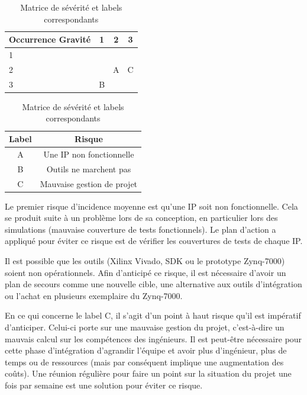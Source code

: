 \begin{table}[H]
	\centering
	\begin{tabular}{|p{2cm}|c|c|c|}
		\hline
		Occurrence \newline Gravité &1	& 2 & 3 \\
		\hline
		1	&  \cellcolor{green} & \cellcolor{green} & \cellcolor{orange}\\
		\hline
		2	& \cellcolor{green}	& A \cellcolor{orange}	& C\cellcolor{red}\\
		\hline
		3	& B \cellcolor{orange}	&	\cellcolor{red}& \cellcolor{red}\\
		\hline
	\end{tabular}
	\hspace{2cm}
	\begin{tabular}{|c|c|}
		\hline
		Label & Risque \\ \hline
		A	\cellcolor{orange} & Une IP non fonctionnelle \\ \hline
		B	\cellcolor{orange} &	Outils ne marchent pas \\ \hline
		C	\cellcolor{red} &	Mauvaise gestion de projet \\ \hline
	\end{tabular}
	\caption{Matrice de sévérité et labels correspondants}
\end{table}

Le premier risque d'incidence moyenne est qu'une IP soit non fonctionnelle.
Cela se produit suite à un problème lors de sa conception, en particulier lors des simulations (mauvaise couverture de tests fonctionnels).
Le plan d'action a appliqué pour éviter ce risque est de vérifier les couvertures de tests de chaque IP.

Il est possible que les outils (Xilinx Vivado, SDK ou le prototype Zynq-7000) soient non opérationnels.
Afin d'anticipé ce risque, il est nécessaire d'avoir un plan de secours comme une nouvelle cible, une alternative aux outils d'intégration ou l'achat en plusieurs exemplaire du Zynq-7000.

En ce qui concerne le label C, il s'agit d'un point à haut risque qu'il est impératif d'anticiper.
Celui-ci porte sur une mauvaise gestion du projet, c'est-à-dire un mauvais calcul sur les compétences des ingénieurs.
Il est peut-être nécessaire pour cette phase d'intégration d'agrandir l'équipe et avoir plus d'ingénieur, plus de temps ou de ressources (mais par conséquent implique une augmentation des coûts).
Une réunion régulière pour faire un point sur la situation du projet une fois par semaine est une solution pour éviter ce risque.

